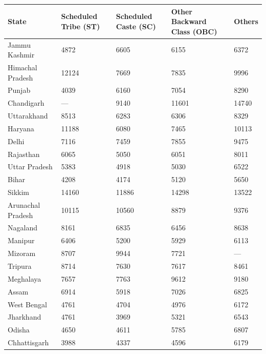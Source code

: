 \documentclass{article}
\begin{document}
	
	\begin{longtable}{|p{4cm}|p{3cm}|p{3cm}|p{3cm}|p{2cm}|}
		\hline
		\textbf{State} & \textbf{Scheduled Tribe (ST)} & \textbf{Scheduled Caste (SC)} & \textbf{Other Backward Class (OBC)} & \textbf{Others} \\ \hline
		\endhead
		
		Jammu  Kashmir    & 4872  & 6605  & 6155  & 6372  \\ \hline
		Himachal Pradesh   & 12124 & 7669  & 7835  & 9996  \\ \hline
		Punjab             & 4039  & 6160  & 7054  & 8290  \\ \hline
		Chandigarh         & ---   & 9140  & 11601 & 14740 \\ \hline
		Uttarakhand        & 8513  & 6283  & 6306  & 8329  \\ \hline
		Haryana            & 11188 & 6080  & 7465  & 10113 \\ \hline
		Delhi              & 7116  & 7459  & 7855  & 9475  \\ \hline
		Rajasthan          & 6065  & 5050  & 6051  & 8011  \\ \hline
		Uttar Pradesh      & 5383  & 4918  & 5030  & 6522  \\ \hline
		Bihar              & 4208  & 4174  & 5120  & 5650  \\ \hline
		Sikkim             & 14160 & 11886 & 14298 & 13522 \\ \hline
		Arunachal Pradesh  & 10115 & 10560 & 8879  & 9376  \\ \hline
		Nagaland           & 8161  & 6835  & 6456  & 8638  \\ \hline
		Manipur            & 6406  & 5200  & 5929  & 6113  \\ \hline
		Mizoram            & 8707  & 9944  & 7721  & ---   \\ \hline
		Tripura            & 8714  & 7630  & 7617  & 8461  \\ \hline
		Meghalaya          & 7657  & 7763  & 9612  & 9180  \\ \hline
		Assam              & 6914  & 5918  & 7026  & 6825  \\ \hline
		West Bengal        & 4761  & 4704  & 4976  & 6172  \\ \hline
		Jharkhand          & 4761  & 3969  & 5321  & 6543  \\ \hline
		Odisha             & 4650  & 4611  & 5785  & 6807  \\ \hline
		Chhattisgarh       & 3988  & 4337  & 4596  & 6179  \\ \hline

\end{longtable}
\end{document}
